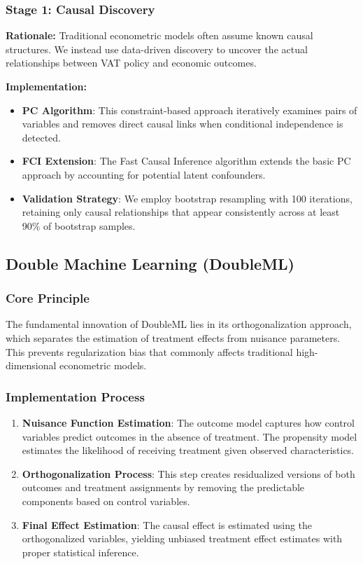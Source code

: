 \subsubsection{Stage 1: Causal Discovery}
\textbf{Rationale:} Traditional econometric models often assume known causal structures. We instead use data-driven discovery to uncover the actual relationships between VAT policy and economic outcomes.

\textbf{Implementation:}
\begin{itemize}
    \item \textbf{PC Algorithm}: This constraint-based approach iteratively examines pairs of variables and removes direct causal links when conditional independence is detected.
    \item \textbf{FCI Extension}: The Fast Causal Inference algorithm extends the basic PC approach by accounting for potential latent confounders.
    \item \textbf{Validation Strategy}: We employ bootstrap resampling with 100 iterations, retaining only causal relationships that appear consistently across at least 90\% of bootstrap samples.
\end{itemize}

\subsection{Double Machine Learning (DoubleML)}\label{subsec:doubleml}

\subsubsection{Core Principle}
The fundamental innovation of DoubleML lies in its orthogonalization approach, which separates the estimation of treatment effects from nuisance parameters. This prevents regularization bias that commonly affects traditional high-dimensional econometric models.

\subsubsection{Implementation Process}
\begin{enumerate}
    \item \textbf{Nuisance Function Estimation}: The outcome model captures how control variables predict outcomes in the absence of treatment. The propensity model estimates the likelihood of receiving treatment given observed characteristics.
    \item \textbf{Orthogonalization Process}: This step creates residualized versions of both outcomes and treatment assignments by removing the predictable components based on control variables.
    \item \textbf{Final Effect Estimation}: The causal effect is estimated using the orthogonalized variables, yielding unbiased treatment effect estimates with proper statistical inference.
\end{enumerate}

